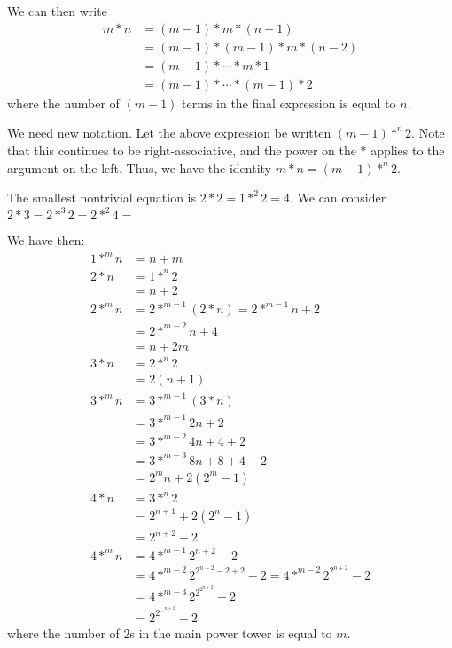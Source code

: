 \documentclass[12pt]{article}
\begin{document}
We can then write
\begin{align*}
    m * n &= (m - 1) * m * (n - 1)\\
          &= (m - 1) * (m - 1) * m * (n - 2)\\
          &= (m - 1) * \cdots * m * 1\\
          &= (m - 1) * \cdots * (m - 1) * 2
\end{align*}
where the number of $(m - 1)$ terms in the
final expression is equal to $n$.

We need new notation. 
Let the above expression be written $(m - 1) *^{n} 2$.
Note that this continues to be right-associative,
and the power on the $*$ applies to the argument on the left.
Thus, we have the identity $m * n = (m - 1) *^{n} 2$.

The smallest nontrivial equation is $2 * 2 = 1 *^{2} 2 = 4$.
We can consider $2 * 3 = 2 *^{3} 2 = 2 *^{2} 4 =$

We have then:
\begin{align*}
    1 *^{m} n &= n + m\\
    2 * n &= 1 *^{n} 2\\
          &= n + 2\\
    2 *^{m} n &= 2 *^{m - 1} (2 * n) = 2 *^{m - 1} n + 2\\
        &= 2 *^{m - 2} n + 4\\
        &= n + 2m\\
    3 * n &= 2 *^{n} 2\\
          &= 2(n + 1)\\
    3 *^{m} n &= 3 *^{m - 1} (3 * n)\\
              &= 3 *^{m-1} 2n + 2\\
              &= 3 *^{m-2} 4n + 4 + 2\\
              &= 3 *^{m-3} 8n + 8 + 4 + 2\\
              &= 2^{m}n + 2(2^{m} - 1)\\
    4 * n &= 3 *^{n} 2\\
          &= 2^{n+1} + 2(2^{n} - 1)\\
          &= 2^{n+2} - 2\\
    4 *^{m} n &= 4 *^{m - 1} 2^{n+2} - 2\\
              &= 4 *^{m - 2} 2^{2^{n+2} - 2 + 2} - 2 = 4 *^{m - 2} 2^{2^{n+2}} - 2\\
              &= 4 *^{m-3} 2^{2^{2^{n+2}}} - 2\\
              &= 2^{2^{\cdots^{n+2}}} - 2
\end{align*}
where the number of $2$s in the main power tower is equal to $m$.
\end{document}
